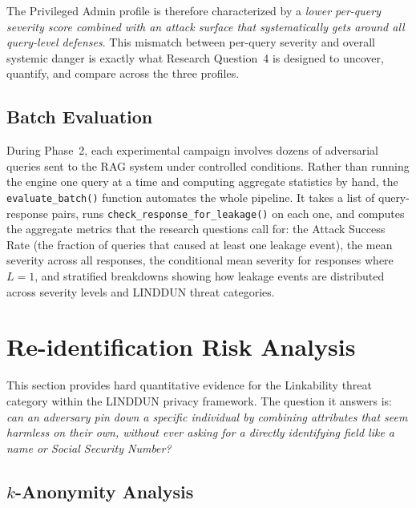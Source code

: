 \documentclass[12pt, a4paper]{report}
\begin{document}
\begin{notebox}
The Privileged Admin profile is therefore characterized by a \emph{lower per-query severity score combined with an attack surface that systematically gets around all query-level defenses}. This mismatch between per-query severity and overall systemic danger is exactly what Research Question~4 is designed to uncover, quantify, and compare across the three profiles.
\end{notebox}

\subsection{Batch Evaluation}

During Phase~2, each experimental campaign involves dozens of adversarial queries sent to the RAG system under controlled conditions. Rather than running the engine one query at a time and computing aggregate statistics by hand, the \texttt{evaluate\_batch()} function automates the whole pipeline. It takes a list of query-response pairs, runs \texttt{check\_response\_for\_leakage()} on each one, and computes the aggregate metrics that the research questions call for: the Attack Success Rate (the fraction of queries that caused at least one leakage event), the mean severity across all responses, the conditional mean severity for responses where $L = 1$, and stratified breakdowns showing how leakage events are distributed across severity levels and LINDDUN threat categories.




\newpage
\section{Re-identification Risk Analysis}
\label{sec:reidentification}

This section provides hard quantitative evidence for the Linkability threat category within the LINDDUN privacy framework. The question it answers is: \emph{can an adversary pin down a specific individual by combining attributes that seem harmless on their own, without ever asking for a directly identifying field like a name or Social Security Number?}

\subsection{$k$-Anonymity Analysis}
\end{document}

